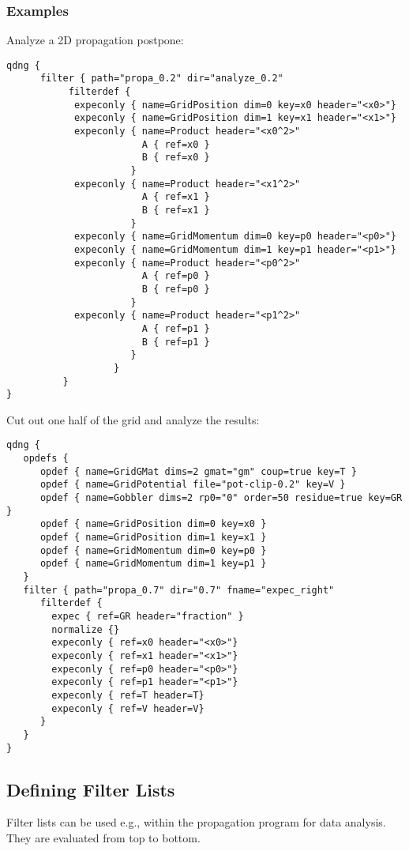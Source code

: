 \documentclass[a4paper,12pt]{scrbook}
\begin{document}
\subsubsection*{Examples}
Analyze a 2D propagation postpone:
\begin{verbatim}
qdng {
      filter { path="propa_0.2" dir="analyze_0.2"
           filterdef {
            expeconly { name=GridPosition dim=0 key=x0 header="<x0>"}
            expeconly { name=GridPosition dim=1 key=x1 header="<x1>"}
            expeconly { name=Product header="<x0^2>"
                        A { ref=x0 }
                        B { ref=x0 }
                      }
            expeconly { name=Product header="<x1^2>"
                        A { ref=x1 }
                        B { ref=x1 }
                      }
            expeconly { name=GridMomentum dim=0 key=p0 header="<p0>"}
            expeconly { name=GridMomentum dim=1 key=p1 header="<p1>"}
            expeconly { name=Product header="<p0^2>"
                        A { ref=p0 }
                        B { ref=p0 }
                      }
            expeconly { name=Product header="<p1^2>"
                        A { ref=p1 }
                        B { ref=p1 }
                      }
                   }
          }
}
\end{verbatim}

Cut out one half of the grid and analyze the results:
\begin{verbatim}
qdng {
   opdefs {
      opdef { name=GridGMat dims=2 gmat="gm" coup=true key=T }
      opdef { name=GridPotential file="pot-clip-0.2" key=V }
      opdef { name=Gobbler dims=2 rp0="0" order=50 residue=true key=GR }
      opdef { name=GridPosition dim=0 key=x0 }
      opdef { name=GridPosition dim=1 key=x1 }
      opdef { name=GridMomentum dim=0 key=p0 }
      opdef { name=GridMomentum dim=1 key=p1 }
   }
   filter { path="propa_0.7" dir="0.7" fname="expec_right"
      filterdef {
	    expec { ref=GR header="fraction" }
	    normalize {}
	    expeconly { ref=x0 header="<x0>"}
	    expeconly { ref=x1 header="<x1>"}
	    expeconly { ref=p0 header="<p0>"}
	    expeconly { ref=p1 header="<p1>"}
	    expeconly { ref=T header=T}
	    expeconly { ref=V header=V}
      }
   }
}
\end{verbatim}


\subsection{Defining Filter Lists}
\label{sec:Filters}
Filter lists can be used e.g., within the propagation program
for data analysis.
They are evaluated from top to bottom.
\end{document}

